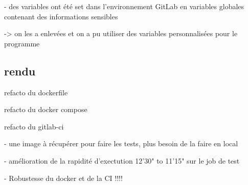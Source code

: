 - des variables ont été set dans l'environnement GitLab en variables globales contenant des informations sensibles

-> on les a enlevées et on a pu utiliser des variables personnalisées pour le programme

\subsection{rendu}
refacto du dockerfile

refacto du docker compose

refacto du gitlab-ci
    
- une image à récupérer pour faire les tests, plus besoin de la faire en local

- amélioration de la rapidité d'exectution 12'30" to 11'15" sur le job de test

- Robustesse du docker et de la CI !!!!
